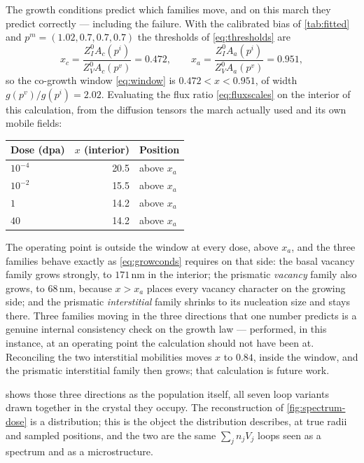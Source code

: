 \label{sec:spectrum-vs-window}%
The growth conditions predict which families move, and on this march they
predict correctly --- including the failure. With the calibrated bias of
\cref{tab:fitted} and $p^{m}=(1.02,0.7,0.7,0.7)$ the thresholds of
\cref{eq:thresholds} are
\begin{equation}
  x_c=\frac{Z^{0}_{I}A_c(p^{i})}{Z^{0}_{V}A_c(p^{v})}=0.472,
  \qquad
  x_a=\frac{Z^{0}_{I}A_a(p^{i})}{Z^{0}_{V}A_a(p^{v})}=0.951,
  \label{eq:measured-thresholds}
\end{equation}
so the co-growth window \cref{eq:window} is $0.472<x<0.951$, of width
$g(p^{v})/g(p^{i})=2.02$. Evaluating the flux ratio \cref{eq:fluxscales} on the
interior of this calculation, from the diffusion tensors the march actually used
and its own mobile fields:

\begin{center}
\begin{tabular}{@{}lrl@{}}
\toprule
Dose (dpa) & $x$ (interior) & Position \\
\midrule
$10^{-4}$ & 20.5 & above $x_a$ \\
$10^{-2}$ & 15.5 & above $x_a$ \\
$1$       & 14.2 & above $x_a$ \\
$40$      & 14.2 & above $x_a$ \\
\bottomrule
\end{tabular}
\end{center}

The operating point is outside the window at every dose, above $x_a$, and the
three families behave exactly as \cref{eq:growconds} requires on that side: the
basal vacancy family grows strongly, to $171\,$nm in the interior; the prismatic
\emph{vacancy} family also grows, to $68\,$nm, because $x>x_a$ places every
vacancy character on the growing side; and the prismatic \emph{interstitial}
family shrinks to its nucleation size and stays there. Three families moving in
the three directions that one number predicts is a genuine internal consistency
check on the growth law --- performed, in this instance, at an operating point
the calculation should not have been at. Reconciling the two interstitial
mobilities moves $x$ to $0.84$, inside the window, and the prismatic
interstitial family then grows; that calculation is future work.

 shows those three directions as the population itself, all
seven loop variants drawn together in the crystal they occupy. The
reconstruction of \cref{fig:spectrum-dose} is a distribution; this is the object
the distribution describes, at true radii and sampled positions, and the two are
the same $\sum_j n_jV_j$ loops seen as a spectrum and as a microstructure.

